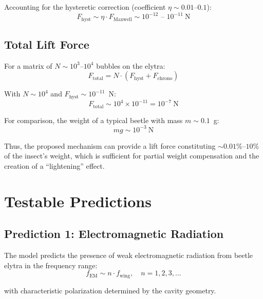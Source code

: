 \documentclass[12pt,a4paper]{article}
\begin{document}
Accounting for the hysteretic correction (coefficient $\eta \sim 0.01$--$0.1$):
\begin{equation}
    F_{\text{hyst}} \sim \eta \cdot F_{\text{Maxwell}} \sim 10^{-12} \text{ -- } 10^{-11}~\text{N}
    \label{eq:hysteresis_force}
\end{equation}

\subsection{Total Lift Force}

For a matrix of $N \sim 10^3$--$10^4$ bubbles on the elytra:
\begin{equation}
    F_{\text{total}} = N \cdot (F_{\text{hyst}} + F_{\text{chrono}})
    \label{eq:total_force}
\end{equation}

With $N \sim 10^4$ and $F_{\text{hyst}} \sim 10^{-11}$~N:
\begin{equation}
    F_{\text{total}} \sim 10^4 \times 10^{-11} = 10^{-7}~\text{N}
    \label{eq:total_estimate}
\end{equation}

For comparison, the weight of a typical beetle with mass $m \sim 0.1$~g:
\begin{equation}
    mg \sim 10^{-3}~\text{N}
    \label{eq:weight}
\end{equation}

Thus, the proposed mechanism can provide a lift force constituting $\sim 0.01\%$--$10\%$ of the insect's weight, which is sufficient for partial weight compensation and the creation of a ``lightening'' effect.

\section{Testable Predictions}

\subsection{Prediction 1: Electromagnetic Radiation}

The model predicts the presence of weak electromagnetic radiation from beetle elytra in the frequency range:
\begin{equation}
    f_{\text{EM}} \sim n \cdot f_{\text{wing}}, \quad n = 1, 2, 3, \ldots
\end{equation}

with characteristic polarization determined by the cavity geometry.
\end{document}
